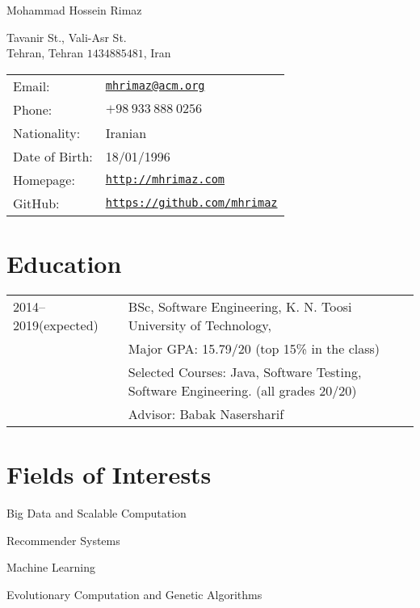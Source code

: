 \documentclass[letterpaper]{article}
\def\name{Mohammad Hossein Rimaz}
\renewenvironment{itemize}{
  \begin{list}{}{
    \setlength{\leftmargin}{1.5em}
  }
}{
  \end{list}
}
\begin{document}
{\huge \name}


\vspace{0.25in}

\begin{minipage}{0.45\linewidth}
  Tavanir St., Vali-Asr St. \\
  Tehran, Tehran $1434885481$, Iran
\end{minipage}
\begin{minipage}{0.45\linewidth}
  \begin{tabular}{ll}
    Email: & \href{mailto:mhrimaz@acm.org}{\tt mhrimaz@acm.org} \\
    Phone: & $+98~933~888~0256$ \\
    Nationality: & Iranian \\
    Date of Birth: & 18/01/1996  \\
    Homepage: & \href{http://mhrimaz.com}{\tt http://mhrimaz.com} \\
    GitHub: & \href{https://mhrimaz.github.io}{\tt https://github.com/mhrimaz} 
  \end{tabular}
\end{minipage}


\section*{Education}

{\renewcommand{\arraystretch}{1.2}
\begin{tabular}{l l}
2014--2019(expected) & BSc, Software Engineering, K. N. Toosi University of Technology,\\
 & Major GPA: 15.79/20 (top 15\% in the class) \\
 & Selected Courses: Java, Software Testing, Software Engineering. (all grades 20/20)\\
 & Advisor: Babak Nasersharif
\end{tabular}
}

\section*{Fields of Interests}
\begin{itemize}
	\item Big Data and Scalable Computation
	\item Recommender Systems
	\item Machine Learning
	\item Evolutionary Computation and Genetic Algorithms
\end{itemize}
\end{document}
